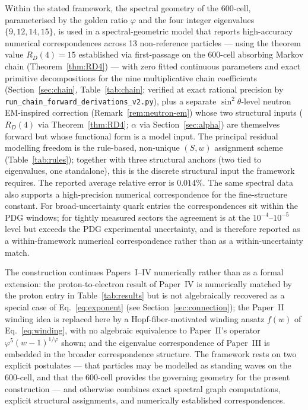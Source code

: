 \documentclass[12pt]{article}
\newcommand{\phig}{\varphi}
\begin{document}
Within the stated framework, the spectral geometry of the 600-cell, parameterised by the golden ratio $\phig$ and the four integer eigenvalues $\{9, 12, 14, 15\}$, is used in a spectral-geometric model that reports high-accuracy numerical correspondences across 13 non-reference particles --- using the theorem value $R_D(4) = 15$ established via first-passage on the 600-cell absorbing Markov chain (Theorem~\ref{thm:RD4}) --- with zero fitted continuous parameters and exact primitive decompositions for the nine multiplicative chain coefficients (Section~\ref{sec:chain}, Table~\ref{tab:chain}; verified at exact rational precision by \texttt{run\_chain\_forward\_derivations\_v2.py}), plus a separate $\sin^2\theta$-level neutron EM-inspired correction (Remark~\ref{rem:neutron-em}) whose two structural inputs ($R_D(4)$ via Theorem~\ref{thm:RD4}; $\alpha$ via Section~\ref{sec:alpha}) are themselves forward but whose functional form is a model input. The principal residual modelling freedom is the rule-based, non-unique $(S,w)$ assignment scheme (Table~\ref{tab:rules}); together with three structural anchors (two tied to eigenvalues, one standalone), this is the discrete structural input the framework requires. The reported average relative error is $0.014\%$. The same spectral data also supports a high-precision numerical correspondence for the fine-structure constant. For broad-uncertainty quark entries the correspondences sit within the PDG windows; for tightly measured sectors the agreement is at the $10^{-4}$--$10^{-5}$ level but exceeds the PDG experimental uncertainty, and is therefore reported as a within-framework numerical correspondence rather than as a within-uncertainty match.

The construction continues Papers~I--IV numerically rather than as a formal extension: the proton-to-electron result of Paper~IV is numerically matched by the proton entry in Table~\ref{tab:results} but is not algebraically recovered as a special case of Eq.~\eqref{eq:exponent} (see Section~\ref{sec:connection}); the Paper~II winding idea is replaced here by a Hopf-fiber-motivated winding ansatz $f(w)$ of Eq.~\eqref{eq:winding}, with no algebraic equivalence to Paper~II's operator $\phig^5(w-1)^{1/\phig}$ shown; and the eigenvalue correspondence of Paper~III is embedded in the broader correspondence structure. The framework rests on two explicit postulates --- that particles may be modelled as standing waves on the 600-cell, and that the 600-cell provides the governing geometry for the present construction --- and otherwise combines exact spectral graph computations, explicit structural assignments, and numerically established correspondences.
\end{document}

